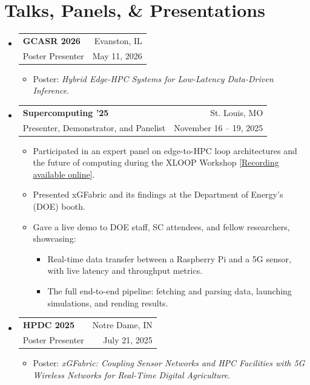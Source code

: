 \documentclass[letterpaper,11pt]{article}
\makeatletter
\newcommand{\cvitem}[1]{
  \item\small{
    {#1\vspace{-2pt}}
  }
}
\newcommand{\cvheading}[4]{
  \vspace{-2pt}\item
    \begin{tabular*}{\textwidth}[t]{l@{\extracolsep{\fill}}r}
      \textbf{#1} & #2 \\
      \small#3 & \small #4 \\
    \end{tabular*}\vspace{-7pt}
}
\newcommand{\cvheadingstart}{\begin{itemize}[leftmargin=0in, label={}]}
\newcommand{\cvheadingend}{\end{itemize}\vspace{-5pt}}
\newcommand{\cvitemstart}{\begin{itemize}\justifying}
\newcommand{\cvitemend}{\end{itemize}\vspace{-5pt}}
\makeatother
\begin{document}
\section{Talks, Panels, \& Presentations}
    \cvheadingstart
    \cvheading
        {GCASR 2026}{Evanston, IL}
        {Poster Presenter}{May 11, 2026}
        \cvitemstart
            \cvitem{Poster: \textit{Hybrid Edge-HPC Systems for Low-Latency Data-Driven Inference}.}
        \cvitemend

        \cvheading
            {Supercomputing '25}{St. Louis, MO}
            {Presenter, Demonstrator, and Panelist}{November 16 -- 19, 2025}
            \begin{small}
                \begin{itemize}[itemindent=0pt]
                    \item Participated in an expert panel on edge-to-HPC loop architectures and the future of computing during the XLOOP Workshop [\href{https://vimeo.com/1139653482?share=copy&fl=sv&fe=ci}{Recording available online}].
                    \item Presented xGFabric and its findings at the Department of Energy's (DOE) booth.
                    \item Gave a live demo to DOE staff, SC attendees, and fellow researchers, showcasing:
                    \begin{itemize}
                        \item{Real-time data transfer between a Raspberry Pi and a 5G sensor, with live latency and throughput metrics.}
                        \item The full end-to-end pipeline: fetching and parsing data, launching simulations, and rending results.
                    \end{itemize}
                \end{itemize}
            \end{small}

        \cvheading
            {HPDC 2025}{Notre Dame, IN}
            {Poster Presenter}{July 21, 2025}
            \cvitemstart
                \cvitem{Poster: \textit{xGFabric: Coupling Sensor Networks and HPC Facilities with 5G Wireless Networks for Real-Time Digital Agriculture}.}
            \cvitemend
    \cvheadingend
\end{document}
